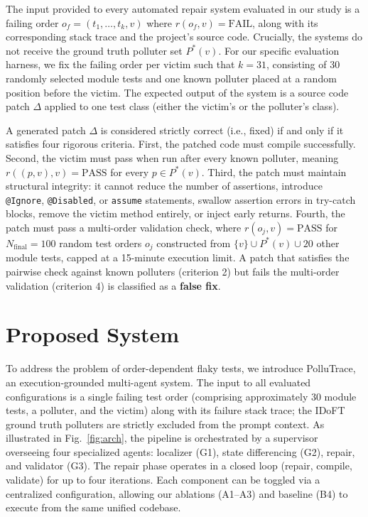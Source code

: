 \documentclass[conference]{IEEEtran}
\begin{document}
The input provided to every automated repair system evaluated in our study is a failing order $o_f = (t_1, \dots, t_k, v)$ where $r(o_f, v) = \text{FAIL}$, along with its corresponding stack trace and the project's source code. Crucially, the systems do not receive the ground truth polluter set $P^*(v)$. For our specific evaluation harness, we fix the failing order per victim such that $k = 31$, consisting of 30 randomly selected module tests and one known polluter placed at a random position before the victim. The expected output of the system is a source code patch $\Delta$ applied to one test class (either the victim's or the polluter's class).

A generated patch $\Delta$ is considered strictly correct (i.e., fixed) if and only if it satisfies four rigorous criteria. First, the patched code must compile successfully. Second, the victim must pass when run after every known polluter, meaning $r((p, v), v) = \text{PASS}$ for every $p \in P^*(v)$. Third, the patch must maintain structural integrity: it cannot reduce the number of assertions, introduce \texttt{@Ignore}, \texttt{@Disabled}, or \texttt{assume} statements, swallow assertion errors in try-catch blocks, remove the victim method entirely, or inject early returns. Fourth, the patch must pass a multi-order validation check, where $r(o_j, v) = \text{PASS}$ for $N_{\text{final}} = 100$ random test orders $o_j$ constructed from $\{v\} \cup P^*(v) \cup 20$ other module tests, capped at a 15-minute execution limit. A patch that satisfies the pairwise check against known polluters (criterion 2) but fails the multi-order validation (criterion 4) is classified as a \textbf{false fix}.

\section{Proposed System}
\label{sec:method}
To address the problem of order-dependent flaky tests, we introduce PolluTrace, an execution-grounded multi-agent system. The input to all evaluated configurations is a single failing test order (comprising approximately 30 module tests, a polluter, and the victim) along with its failure stack trace; the IDoFT ground truth polluters are strictly excluded from the prompt context. As illustrated in Fig.~\ref{fig:arch}, the pipeline is orchestrated by a supervisor overseeing four specialized agents: localizer (G1), state differencing (G2), repair, and validator (G3). The repair phase operates in a closed loop (repair, compile, validate) for up to four iterations. Each component can be toggled via a centralized configuration, allowing our ablations (A1–A3) and baseline (B4) to execute from the same unified codebase.
\end{document}
